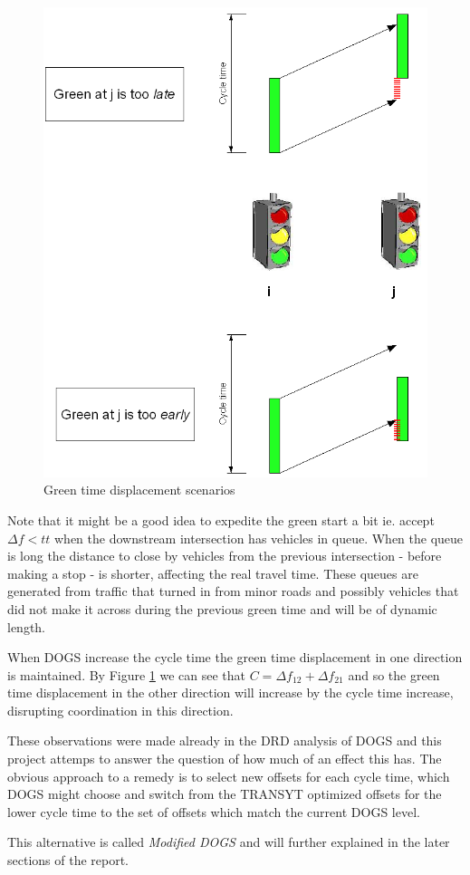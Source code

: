 \begin{figure}[htbp]
\centering
\includegraphics[scale=0.30]{green_time_displacement.png} 
\caption{Green time displacement scenarios}
\label{fig:green_time_displacement}
\end{figure}

Note that it might be a good idea to expedite the green start a bit ie. accept $\Delta f < tt$ when the downstream intersection has vehicles in queue. When the queue is long the distance to close by vehicles from the previous intersection - before making a stop - is shorter, affecting the real travel time. These queues are generated from traffic that turned in from minor roads and possibly vehicles that did not make it across during the previous green time and will be of dynamic length.

When DOGS increase the cycle time the green time displacement in one direction is maintained. By Figure \ref{fig:green_time_displacement} we can see that $C = \Delta f_{12} + \Delta f_{21}$ and so the green time displacement in the other direction will increase by the cycle time increase, disrupting coordination in this direction.

These observations were made already in the DRD analysis of DOGS \cite{dogs} and this project attemps to answer the question of how much of an effect this has. The obvious approach to a remedy is to select new offsets for each cycle time, which DOGS might choose and switch from the TRANSYT optimized offsets for the lower cycle time to the set of offsets which match the current DOGS level.

This alternative is called \textit{Modified DOGS} and will further explained in the later sections of the report.